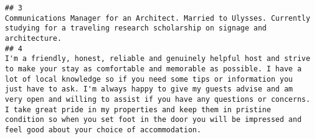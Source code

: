 \documentclass[
]{article}
\begin{document}
\begin{verbatim}
## 3                                                                                                                                                                                                                                                                                                                                                                                                                                                                                                                                                                                                                                                                                                                                                                                                                                                                                                                                                                                                                                                                                                                                                                    Communications Manager for an Architect. Married to Ulysses. Currently studying for a traveling research scholarship on signage and architecture.
## 4                                                                                                                                                                                                                                                                                                                                                                                                                                                                                                                                                                                                                                                                                                                                                                         I'm a friendly, honest, reliable and genuinely helpful host and strive  to make your stay as comfortable and memorable as possible. I have a lot of local knowledge so if you need some tips or information you just have to ask. I'm always happy to give my guests advise and am very open and willing to assist if you have any questions or concerns. I take great pride in my properties and keep them in pristine condition so when you set foot in the door you will be impressed and feel good about your choice of accommodation.  

\end{verbatim}
\end{document}
